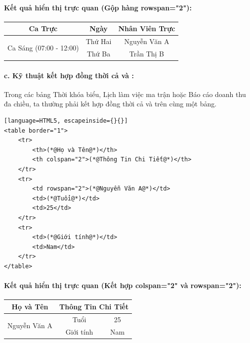 \paragraph{\textbf{Kết quả hiển thị trực quan (Gộp hàng rowspan="2"):}}
\begin{prettyTableBox}[Kết Quả Hiển Thị Gộp Hàng Rowspan (border="1")]
\centering
\vspace{4pt}
\bgroup
\renewcommand{\arraystretch}{1.4}
\setlength{\tabcolsep}{14pt}
\begin{tabular}{|c|c|c|}
\hline
\textbf{Ca Trực} & \textbf{Ngày} & \textbf{Nhân Viên Trực} \\
\hline
\multirow{2}{*}{Ca Sáng (07:00 - 12:00)} & Thứ Hai & Nguyễn Văn A \\
\cline{2-3}
 & Thứ Ba & Trần Thị B \\
\hline
\end{tabular}
\egroup
\vspace{4pt}
\end{prettyTableBox}

\paragraph{c. Kỹ thuật kết hợp đồng thời cả  và :}

Trong các bảng Thời khóa biểu, Lịch làm việc ma trận hoặc Báo cáo doanh thu đa chiều, ta thường phải kết hợp đồng thời cả  và  trên cùng một bảng.

\begin{codeWindow}
\begin{lstlisting}[language=HTML5, escapeinside={}{}]
<table border="1">
    <tr>
        <th>(*@Họ và Tên@*)</th>
        <th colspan="2">(*@Thông Tin Chi Tiết@*)</th>
    </tr>
    <tr>
        <td rowspan="2">(*@Nguyễn Văn A@*)</td>
        <td>(*@Tuổi@*)</td>
        <td>25</td>
    </tr>
    <tr>
        <td>(*@Giới tính@*)</td>
        <td>Nam</td>
    </tr>
</table>
\end{lstlisting}
\end{codeWindow}

\paragraph{\textbf{Kết quả hiển thị trực quan (Kết hợp colspan="2" và rowspan="2"):}}
\begin{prettyTableBox}[Kết Quả Hiển Thị Kết Hợp Colspan \& Rowspan (border="1")]
\centering
\vspace{4pt}
\bgroup
\renewcommand{\arraystretch}{1.4}
\setlength{\tabcolsep}{14pt}
\begin{tabular}{|c|c|c|}
\hline
\textbf{Họ và Tên} & \multicolumn{2}{c|}{\textbf{Thông Tin Chi Tiết}} \\
\hline
\multirow{2}{*}{Nguyễn Văn A} & Tuổi & 25 \\
\cline{2-3}
 & Giới tính & Nam \\
\hline
\end{tabular}
\egroup
\vspace{4pt}
\end{prettyTableBox}

